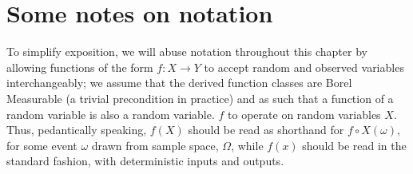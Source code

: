 \section{Some notes on notation}\label{sec:notation}
To simplify exposition, we will abuse notation throughout this chapter by allowing functions of the
form \(f: X \to Y \) to accept random and observed variables interchangeably; we assume that the
derived function classes are Borel Measurable (a trivial precondition in practice) and as such that
a function of a random variable is also a random variable. \(f\) to operate on random variables
\(X\).
Thus, pedantically speaking, \( f(X) \) should be read as shorthand for \( f \circ X(\omega) \),
for some event \( \omega \) drawn from sample space, \( \Omega \), while \( f(x) \) should be read
in the standard fashion, with deterministic inputs and outputs.
